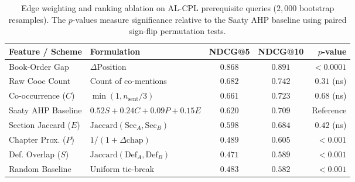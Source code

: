 \begin{table}[t]
\centering
\small
\caption{Edge weighting and ranking ablation on AL-CPL prerequisite queries ($2{,}000$ bootstrap resamples). The $p$-values measure significance relative to the Saaty AHP baseline using paired sign-flip permutation tests.}
\label{tab:weighting_ablation}
\begin{tabularx}{\columnwidth}{l X c c r}
\toprule
\textbf{Feature / Scheme} & \textbf{Formulation} & \textbf{NDCG@5} & \textbf{NDCG@10} & \textbf{$p$-value} \\
\midrule
Book-Order Gap & $\Delta \text{Position}$ & $\mathbf{0.868}$ & $\mathbf{0.891}$ & $< 0.0001$ \\
Raw Cooc Count & Count of co-mentions & $0.682$ & $0.742$ & $0.31$ (ns) \\
Co-occurrence ($C$) & $\min(1, n_{\text{sent}}/3)$ & $0.661$ & $0.723$ & $0.68$ (ns) \\
Saaty AHP Baseline & $0.52S + 0.24C + 0.09P + 0.15E$ & $0.620$ & $0.709$ & Reference \\
Section Jaccard ($E$) & $\text{Jaccard}(\text{Sec}_A, \text{Sec}_B)$ & $0.598$ & $0.684$ & $0.42$ (ns) \\
Chapter Prox. ($P$) & $1 / (1 + \Delta \text{chap})$ & $0.489$ & $0.605$ & $< 0.001$ \\
Def. Overlap ($S$) & $\text{Jaccard}(\text{Def}_A, \text{Def}_B)$ & $0.471$ & $0.589$ & $< 0.001$ \\
Random Baseline & Uniform tie-break & $0.483$ & $0.582$ & $< 0.001$ \\
\bottomrule
\end{tabularx}
\end{table}
